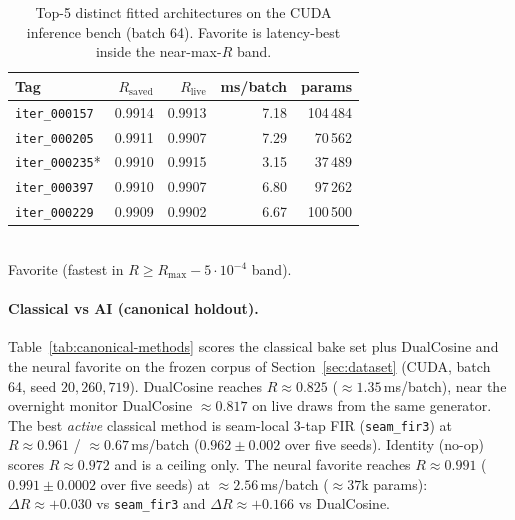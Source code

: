 \begin{table}[t]
  \centering
  \caption{Top-5 distinct fitted architectures on the CUDA inference bench (batch 64). Favorite is latency-best inside the near-max-$R$ band.}
  \label{tab:top5}
  \setlength{\tabcolsep}{3pt}
  \begin{tabular}{@{}lrrrr@{}}
    \toprule
    Tag & $R_{\mathrm{saved}}$ & $R_{\mathrm{live}}$ & ms/batch & params \\
    \midrule
    \texttt{iter\_000157} & 0.9914 & 0.9913 & 7.18 & 104\,484 \\
    \texttt{iter\_000205} & 0.9911 & 0.9907 & 7.29 & 70\,562 \\
    \texttt{iter\_000235}* & 0.9910 & 0.9915 & 3.15 & 37\,489 \\
    \texttt{iter\_000397} & 0.9910 & 0.9907 & 6.80 & 97\,262 \\
    \texttt{iter\_000229} & 0.9909 & 0.9902 & 6.67 & 100\,500 \\
    \bottomrule
  \end{tabular}\\[0.4em]
  {\footnotesize *Favorite (fastest in $R\ge R_{\max}-5\cdot10^{-4}$ band).}
\end{table}

\paragraph{Classical vs AI (canonical holdout).}
Table~\ref{tab:canonical-methods} scores the classical bake set plus DualCosine and the neural favorite on the frozen corpus of Section~\ref{sec:dataset} (CUDA, batch 64, seed $20{,}260{,}719$).
DualCosine reaches $R\approx 0.825$ ($\approx 1.35$\,ms/batch), near the overnight monitor DualCosine $\approx 0.817$ on live draws from the same generator.
The best \emph{active} classical method is seam-local 3-tap FIR (\texttt{seam\_fir3}) at $R\approx 0.961$ / $\approx 0.67$\,ms/batch ($0.962\pm0.002$ over five seeds).
Identity (no-op) scores $R\approx 0.972$ and is a ceiling only.
The neural favorite reaches $R\approx 0.991$ ($0.991\pm0.0002$ over five seeds) at $\approx 2.56$\,ms/batch ($\approx 37$k params): $\Delta R \approx {+}0.030$ vs \texttt{seam\_fir3} and $\Delta R \approx {+}0.166$ vs DualCosine.

